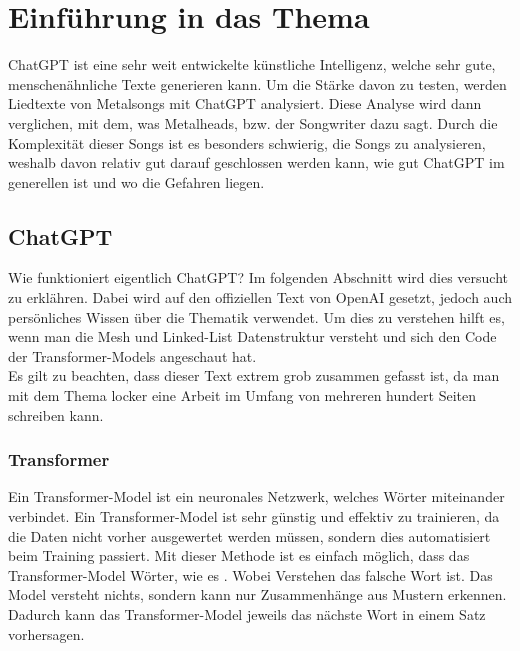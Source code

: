 \documentclass[twocolumn,10pt]{article}
\begin{document}
	\section{Einführung in das Thema}
	ChatGPT\cite{ChatGPT} ist eine sehr weit entwickelte künstliche Intelligenz, welche sehr gute, menschenähnliche Texte generieren kann. Um die Stärke davon zu testen, werden Liedtexte von Metalsongs mit ChatGPT analysiert. Diese Analyse wird dann verglichen, mit dem, was Metalheads, bzw. der Songwriter dazu sagt. Durch die Komplexität dieser Songs ist es besonders schwierig, die Songs zu analysieren, weshalb davon relativ gut darauf geschlossen werden kann, wie gut ChatGPT im generellen ist und wo die Gefahren liegen.
	\subsection{ChatGPT}
	Wie funktioniert eigentlich ChatGPT\cite{ChatGPT}? Im folgenden Abschnitt wird dies versucht zu erklähren. Dabei wird auf den offiziellen Text von OpenAI\cite{openai_2022} gesetzt, jedoch auch persönliches Wissen über die Thematik verwendet. Um dies zu verstehen hilft es, wenn man die Mesh\cite{mesh} und Linked-List\cite{linkedlist} Datenstruktur versteht und sich den Code der Transformer-Models\cite{huggingface_2023} angeschaut hat.\\
	Es gilt zu beachten, dass dieser Text extrem grob zusammen gefasst ist, da man mit dem Thema locker eine Arbeit im Umfang von mehreren hundert Seiten schreiben kann.
	\subsubsection{Transformer}
	Ein Transformer-Model ist ein neuronales Netzwerk, welches Wörter miteinander verbindet. Ein Transformer-Model ist sehr günstig und effektiv zu trainieren, da die Daten nicht vorher ausgewertet werden müssen, sondern dies automatisiert beim Training passiert. Mit dieser Methode ist es einfach möglich, dass das Transformer-Model Wörter, wie es . Wobei Verstehen das falsche Wort ist. Das Model versteht nichts, sondern kann nur Zusammenhänge aus Mustern erkennen. Dadurch kann das Transformer-Model jeweils das nächste Wort in einem Satz vorhersagen.
\end{document}
